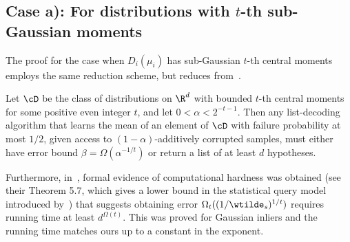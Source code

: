 \subsection{Case a): For distributions with \(t\)-th sub-Gaussian moments}
The proof for the case when \(D_i(\mu_i)\) has sub-Gaussian \(t\)-th central moments employs the same reduction scheme, but reduces from~. 
\begin{proposition}
\label{prop:book_lb_bounded}
    Let \(\cD\) be the class of distributions on \(\R^d\) with bounded \(t\)-th central moments for some positive even integer \(t\), and let \(0 < \alpha < 2^{-t - 1}\). Then any list-decoding algorithm that learns the mean of an element of \(\cD\) with failure probability at most \(1/2\), given access to \((1-\alpha)\)-additively corrupted samples, must either have error bound \(\beta = \Omega(\alpha^{-1/t})\) or return a list of at least \(d\) hypotheses. 
\end{proposition}

Furthermore, in~\cite{diakonikolas2018list}, formal evidence of computational hardness was obtained (see their Theorem 5.7, which gives a lower bound in the statistical query model introduced by~\cite{kearns1998efficient}) that suggests obtaining error $\Omega_t((1/\wtilde_s)^{1/t})$ requires running time at least $d^{\Omega(t)}$.
This was proved for Gaussian inliers and the running time matches ours up to a constant in the exponent.